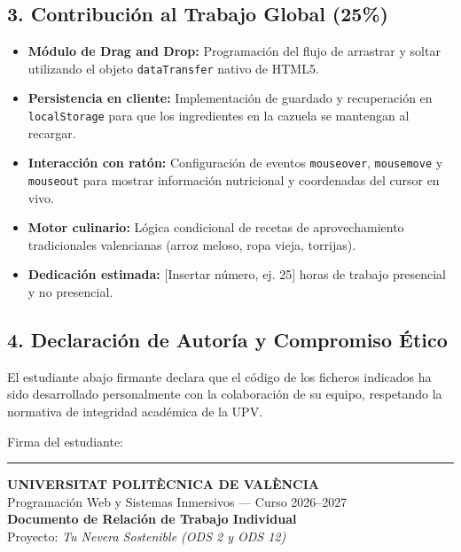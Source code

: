 \documentclass[11pt,a4paper]{article}
\begin{document}
\subsection*{3. Contribución al Trabajo Global (25\%)}
\begin{itemize}
    \item \textbf{Módulo de Drag and Drop:} Programación del flujo de arrastrar y soltar utilizando el objeto \texttt{dataTransfer} nativo de HTML5.
    \item \textbf{Persistencia en cliente:} Implementación de guardado y recuperación en \texttt{localStorage} para que los ingredientes en la cazuela se mantengan al recargar.
    \item \textbf{Interacción con ratón:} Configuración de eventos \texttt{mouseover}, \texttt{mousemove} y \texttt{mouseout} para mostrar información nutricional y coordenadas del cursor en vivo.
    \item \textbf{Motor culinario:} Lógica condicional de recetas de aprovechamiento tradicionales valencianas (arroz meloso, ropa vieja, torrijas).
    \item \textbf{Dedicación estimada:} [Insertar número, ej. 25] horas de trabajo presencial y no presencial.
\end{itemize}

\subsection*{4. Declaración de Autoría y Compromiso Ético}
El estudiante abajo firmante declara que el código de los ficheros indicados ha sido desarrollado personalmente con la colaboración de su equipo, respetando la normativa de integridad académica de la UPV.

\vspace{1.2cm}
\begin{flushright}
    Firma del estudiante:\ \rule{6cm}{0.4pt}
\end{flushright}

\newpage

\begin{center}
    {\Large \textbf{UNIVERSITAT POLITÈCNICA DE VALÈNCIA}}\\[0.2cm]
    {\large Programación Web y Sistemas Inmersivos --- Curso 2026--2027}\\[0.3cm]
    {\LARGE \textbf{\color{azulOscuro}Documento de Relación de Trabajo Individual}}\\[0.2cm]
    {\small Proyecto: \textit{Tu Nevera Sostenible (ODS 2 y ODS 12)}}
\end{center}
\end{document}
